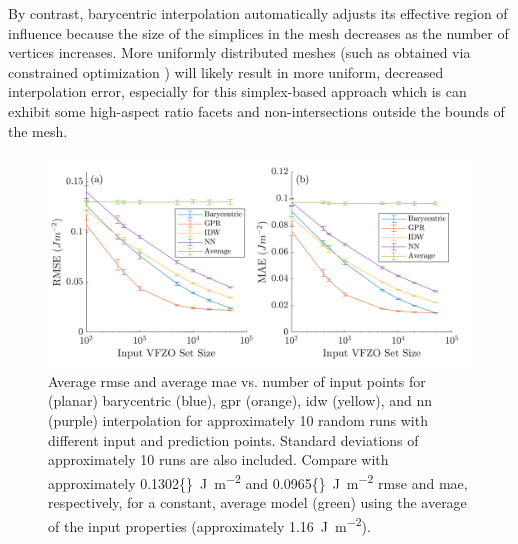 \documentclass[final,twocolumn,12pt]{elsarticle}
\newcommand{\inpt}{input}
\newcommand{\outpt}{prediction}
\newcommand{\avgrmse}{0.1302}
\newcommand{\avgmae}{0.0965}
\begin{document}
By contrast, barycentric interpolation automatically adjusts its effective region of influence because the size of the simplices in the mesh decreases as the number of vertices increases. More uniformly distributed meshes (such as obtained via constrained optimization \cite{dolanBenchmarkingOptimizationSoftware2004,ConstrainedElectrostaticNonlinear2020}) will likely result in more uniform, decreased interpolation error, especially for this simplex-based approach which is can exhibit some high-aspect ratio facets and non-intersections outside the bounds of the mesh. %


\begin{figure}
    \centering
    \includegraphics[scale=1]{brkerror.png}
    \caption{Average \gls{rmse} and average \gls{mae} vs. number of \inpt{} points for (planar) barycentric (blue), \gls{gpr} (orange), \gls{idw} (yellow), and \gls{nn} (purple) interpolation for approximately 10 random runs with different \inpt{} and \outpt{} points. Standard deviations of approximately 10 runs are also included. Compare with approximately \SI{\avgrmse{}}{\J\per\square\meter} and \SI{\avgmae{}}{\J\per\square\meter} \gls{rmse} and \gls{mae}, respectively, for a constant, average model (green) using the average of the \inpt{} properties (approximately \SI{1.16}{\J\per\square\meter}).}
    \label{fig:brkerror}
\end{figure}
\end{document}
